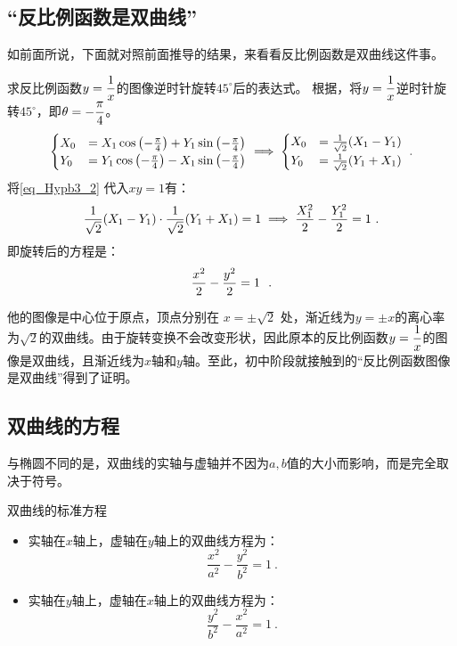 \subsection{“反比例函数是双曲线”}

如前面所说，下面就对照前面推导的结果，来看看反比例函数是双曲线这件事。

\begin{example}{求反比例函数$\displaystyle y={1\over x}$的图像逆时针旋转$45^\circ$后的表达式。}
根据，将$\displaystyle y={1\over x}$逆时针旋转$45^\circ$，即$\displaystyle\theta=-{\pi\over4}$。
\begin{equation}\label{eq_Hypb3_2}
\begin{cases}
\displaystyle
X_0&=X_1 \cos \left(-{\pi\over4}\right) + Y_1 \sin \left(-{\pi\over4}\right)\\
Y_0&=Y_1 \cos \left(-{\pi\over4}\right) - X_1 \sin \left(-{\pi\over4}\right)\\
\end{cases}\implies
\begin{cases}
X_0&={1\over\sqrt{2}}(X_1 - Y_1)\\
Y_0&={1\over\sqrt{2}}(Y_1+ X_1) \\
\end{cases}~.
\end{equation}
将\autoref{eq_Hypb3_2} 代入$xy=1$有：
\begin{equation}
\displaystyle
{1\over\sqrt{2}}(X_1 - Y_1)\cdot{1\over\sqrt{2}}(Y_1+ X_1)=1\implies {X_1^2\over2}- {Y_1^2\over2}=1~.
\end{equation}
即旋转后的方程是：
\begin{equation}
{x^2\over2}- {y^2\over2}=1~~.
\end{equation}
\end{example}

他的图像是中心位于原点，顶点分别在 $x = \pm \sqrt{2}$ 处，渐近线为$y = \pm x$的离心率为$\sqrt{2}$的双曲线。由于旋转变换不会改变形状，因此原本的反比例函数$\displaystyle y={1\over x}$的图像是双曲线，且渐近线为$x$轴和$y$轴。至此，初中阶段就接触到的“反比例函数图像是双曲线”得到了证明。

\subsection{双曲线的方程}

与椭圆不同的是，双曲线的实轴与虚轴并不因为$a,b$值的大小而影响，而是完全取决于符号。
\begin{theorem}{双曲线的标准方程}
\begin{itemize}
\item 实轴在$x$轴上，虚轴在$y$轴上的双曲线方程为：
\begin{equation}\label{eq_Hypb3_4}
\frac{x^2}{a^2} - \frac{y^2}{b^2} = 1~.
\end{equation}
\item 实轴在$y$轴上，虚轴在$x$轴上的双曲线方程为：
\begin{equation}
\frac{y^2}{b^2} -\frac{x^2}{a^2}  = 1~.
\end{equation}
\end{itemize}
\end{theorem}

